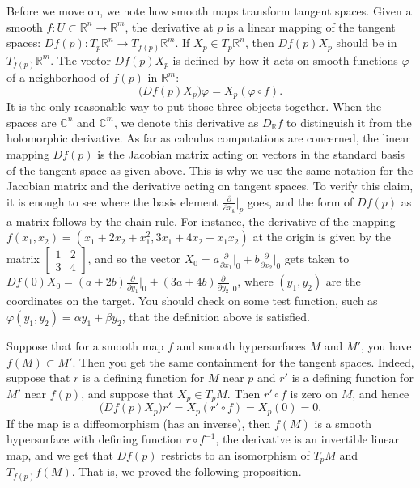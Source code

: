 \documentclass[12pt,openany]{book}
\newcommand{\C}{{\mathbb{C}}}
\newcommand{\R}{{\mathbb{R}}}
\theoremstyle{plain}
\theoremstyle{remark}
\theoremstyle{definition}
\theoremstyle{exercise}
\theoremstyle{example}
\begin{document}
Before we move on, we note how smooth maps transform tangent spaces.
Given a smooth
$f \colon U \subset \R^n \to \R^m$,
the derivative at $p$ is a linear mapping of
the tangent spaces: $Df(p) \colon T_p \R^n \to T_{f(p)} \R^m$.
If $X_p \in T_p \R^n$, then
$Df(p) X_p$ should be in $T_{f(p)} \R^m$.
The vector
$Df(p) X_p$ is defined by how it acts on
smooth functions $\varphi$ of a neighborhood
of $f(p)$ in $\R^m$:
%
\begin{equation*}
\bigl( Df(p) X_p \bigr) \varphi = X_p (\varphi \circ f) .
\end{equation*}
It is the only reasonable way to put those three objects together.
When the spaces are $\C^n$ and $\C^m$, we denote this
derivative as
%
$D_\R f$
to distinguish it from the holomorphic derivative.
As far as calculus computations are concerned,
the linear mapping $Df(p)$ is
the Jacobian matrix acting on vectors in the standard basis of the tangent space
as given above.
This is why we use the same notation for the Jacobian
matrix and the derivative acting on tangent spaces.
To verify this claim, it is enough to see where the basis element
$\frac{\partial}{\partial x_k}\big|_p$ goes, and the form of $Df(p)$
as a matrix
follows by the chain rule.
For instance, the derivative of the mapping $f(x_1,x_2) =
(x_1+2x_2+x_1^2,3x_1+4x_2+x_1x_2)$ at the origin is given by the matrix
$\left[ \begin{smallmatrix} 1 & 2 \\ 3 & 4 \end{smallmatrix} \right]$,
and so the vector
$X_0 = a\frac{\partial}{\partial x_1}\big|_0
+
b\frac{\partial}{\partial x_2}\big|_0$
gets taken to
$Df(0) X_0 = (a+2b)\frac{\partial}{\partial y_1}\big|_0
+
(3a+4b)\frac{\partial}{\partial y_2}\big|_0$, where $(y_1,y_2)$ are the
coordinates on the target.  You should check on some test
function, such as
$\varphi(y_1,y_2) = \alpha y_1 + \beta y_2$, that the definition above is
satisfied.

Suppose that for a smooth map $f$ and smooth hypersurfaces $M$ and $M'$,
you have $f(M) \subset M'$.  Then you get the same containment for the
tangent spaces.  Indeed, suppose that $r$ is a defining function for $M$
near $p$ and $r'$ is a defining function for $M'$ near $f(p)$, and
suppose that $X_p \in T_p M$.  Then $r' \circ f$ is zero on $M$,
and hence
\begin{equation*}
\bigl( Df(p) X_p \bigr) r' = X_p (r' \circ f) = X_p (0) = 0 .
\end{equation*}
If the map is a diffeomorphism (has an inverse), then $f(M)$ is a smooth
hypersurface with defining function $r \circ f^{-1}$, the derivative is
an invertible linear map, and we get that $Df(p)$ restricts to an
isomorphism of $T_pM$ and $T_{f(p)} f(M)$.  That is, we proved the following
proposition.
\end{document}
